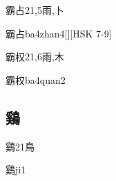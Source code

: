 \begin{Entry}{霸占}{21,5}{⾬,⼘}
  \begin{Phonetics}{霸占}{ba4zhan4}[][HSK 7-9]
  \end{Phonetics}
\end{Entry}

\begin{Entry}{霸权}{21,6}{⾬,⽊}
  \begin{Phonetics}{霸权}{ba4quan2}
  \end{Phonetics}
\end{Entry}

\subsection*{鷄}

\begin{Entry}{鷄}{21}{⿃}
  \begin{Phonetics}{鷄}{ji1}
  \end{Phonetics}
\end{Entry}


